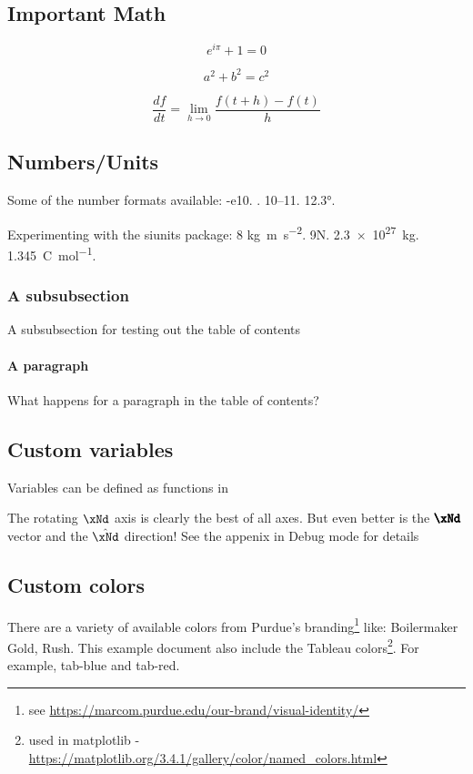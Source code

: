 \subsection{Important Math}

\begin{equation}
    e^{i\pi}+1=0
    \label{eq:euler}
\end{equation}

\begin{equation}
    a^2+b^2=c^2
    \label{eq:pythagorean}
\end{equation}

\begin{equation}
    \frac{df}{dt} = \lim_{h\rightarrow 0} \frac{f(t+h)-f(t)}{h}
    \label{eq:calculus}
\end{equation}

\subsection{Numbers/Units}
Some of the number formats available: \num{-e10}. . \numrange{10}{11}. \ang{12.3}.

Experimenting with the siunits package: 8 \unit{\kilo\gram\metre\per\square\second}. 9\unit{\newton}. \qty{2.3e27}{\kilogram}. \qty[per-mode = fraction]{1,345}{\coulomb\per\mole}.

\subsubsection{A subsubsection} 
A subsubsection for testing out the table of contents

\paragraph{A paragraph}
What happens for a paragraph in the table of contents?

\subsection{Custom variables}

Variables can be defined as functions in 

The rotating $\xNd$ axis is clearly the best of all axes. But even better is the $\vectorFmt{\xNd}$ vector and the $\unitVecFmt{\xNd}$ direction! See the appenix in Debug mode for details

\subsection{Custom colors}
There are a variety of available colors from Purdue's branding\footnote{see \href{https://marcom.purdue.edu/our-brand/visual-identity/}{https://marcom.purdue.edu/our-brand/visual-identity/}} like: {\color{purdue-boilermaker-gold} Boilermaker Gold}, {\color{purdue-rush} Rush}. This example document also include the Tableau colors\footnote{used in matplotlib - \href{https://matplotlib.org/3.4.1/gallery/color/named_colors.html}{https://matplotlib.org/3.4.1/gallery/color/named\_colors.html}}. For example, {\color{tab-blue} tab-blue} and {\color{tab-red} tab-red}.

